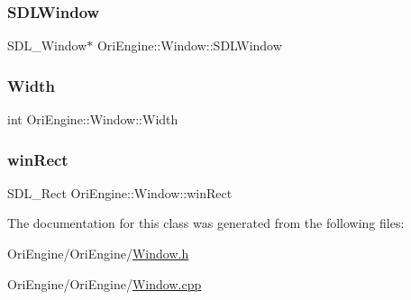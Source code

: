 \hypertarget{class_ori_engine_1_1_window_ab89e66fc9f835484f073a7ac7c1ee546}{}\label{class_ori_engine_1_1_window_ab89e66fc9f835484f073a7ac7c1ee546} 
\subsubsection{\texorpdfstring{S\+D\+L\+Window}{SDLWindow}}
{\footnotesize\ttfamily S\+D\+L\+\_\+\+Window$\ast$ Ori\+Engine\+::\+Window\+::\+S\+D\+L\+Window\hspace{0.3cm}{\ttfamily [private]}}

\hypertarget{class_ori_engine_1_1_window_a3f618d387c7429ade0b51f3c76c1ebb6}{}\label{class_ori_engine_1_1_window_a3f618d387c7429ade0b51f3c76c1ebb6} 
\subsubsection{\texorpdfstring{Width}{Width}}
{\footnotesize\ttfamily int Ori\+Engine\+::\+Window\+::\+Width\hspace{0.3cm}{\ttfamily [private]}}

\hypertarget{class_ori_engine_1_1_window_a1e2e93b43d6b1ca022ad8393db7ac35f}{}\label{class_ori_engine_1_1_window_a1e2e93b43d6b1ca022ad8393db7ac35f} 
\subsubsection{\texorpdfstring{win\+Rect}{winRect}}
{\footnotesize\ttfamily S\+D\+L\+\_\+\+Rect Ori\+Engine\+::\+Window\+::win\+Rect\hspace{0.3cm}{\ttfamily [private]}}



The documentation for this class was generated from the following files\+:\begin{DoxyCompactItemize}
\item 
Ori\+Engine/\+Ori\+Engine/\hyperlink{_window_8h}{Window.\+h}\item 
Ori\+Engine/\+Ori\+Engine/\hyperlink{_window_8cpp}{Window.\+cpp}\end{DoxyCompactItemize}
